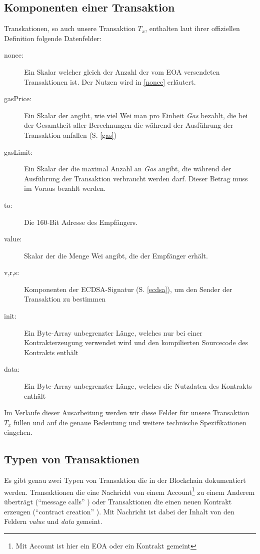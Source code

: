 \documentclass[runningheads]{llncs}
\begin{document}
\subsection{Komponenten einer Transaktion}
\label{komponenten}
Transkationen, so auch unsere Transaktion $T_x$, enthalten laut ihrer offiziellen Definition \cite[S. 4]{wood_ethereum/yellowpaper_2019} folgende Datenfelder:
\begin{description}
  \item[nonce:] Ein Skalar welcher gleich der Anzahl der vom EOA versendeten Transaktionen ist. Der Nutzen wird in \ref{nonce} erläutert.
  \item[gasPrice:] Ein Skalar der angibt, wie viel Wei man pro Einheit \textit{Gas} bezahlt, die bei der Gesamtheit aller Berechnungen die während der Ausführung der Transaktion anfallen (S. \ref{gas})
  \item[gasLimit:] Ein Skalar der die maximal Anzahl an \textit{Gas} angibt, die während der Ausführung der Transaktion verbraucht werden darf. Dieser Betrag muss im Voraus bezahlt werden.
  \item[to:] Die 160-Bit Adresse des Empfängers.
  \item[value:] Skalar der die Menge Wei angibt, die der Empfänger erhält.
  \item[v,r,s:] Komponenten der ECDSA-Signatur (S. \ref{ecdsa}), um den Sender der Transaktion zu bestimmen
  \item[init:] Ein Byte-Array unbegrenzter Länge, welches nur bei einer Kontrakterzeugung verwendet wird und den kompilierten Sourcecode des Kontrakts enthält
  \item[data:] Ein Byte-Array unbegrenzter Länge, welches die Nutzdaten des Kontrakts enthält
\end{description}
Im Verlaufe dieser Ausarbeitung werden wir diese Felder für unsere Transaktion $T_x$ füllen und auf die genaue Bedeutung und weitere technische Spezifikationen eingehen. 


\subsection{Typen von Transaktionen}
\label{types}
Es gibt genau zwei Typen von Transaktion die in der Blockchain dokumentiert werden. Transaktionen die eine Nachricht von einem Account\footnote{Mit Account ist hier ein EOA oder ein Kontrakt gemeint} zu einem Anderem überträgt ("`message calls"' \cite[S. 4]{wood_ethereum/yellowpaper_2019}) oder Transaktionen die einen neuen Kontrakt erzeugen ("`contract creation"' \cite[S. 4]{wood_ethereum/yellowpaper_2019}). Mit Nachricht ist dabei der Inhalt von den Feldern \textit{value} und \textit{data} gemeint.
\end{document}

